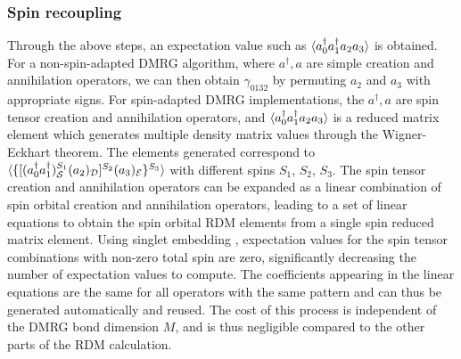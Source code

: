 \subsubsection{Spin recoupling}

Through the above steps, an expectation value such as $\braket{{a}^\dagger_0{a}^\dagger_1{a}_2{a}_3}$ is obtained. 
For a non-spin-adapted DMRG algorithm, where $a^\dag, a$ are simple creation and annihilation operators, 
we can then obtain $\gamma_{0132}$ by permuting $ {a}_2$ and ${a}_3$ with appropriate signs. For spin-adapted DMRG implementations, the $a^\dag, a$ 
are spin tensor creation and annihilation operators, and
$\braket{{a}^\dagger_0{a}^\dagger_1{a}_2{a}_3}$ is a reduced matrix element which generates multiple density matrix 
values through the Wigner-Eckhart theorem.
 The elements generated correspond to $\braket{\{[({a}^\dagger_0{a}^\dagger_1)^{S_1}_{\mathcal{S}}({a}_2)_{\mathcal{D}}]^{S_2}({a}_3)_{\mathcal{E}}\}^{S_3}}$ with different spins $S_1$, $S_2$, $S_3$. The spin tensor creation and annihilation operators can be expanded as a linear combination of spin orbital creation
and annihilation operators, leading to a set of linear equations to obtain the spin orbital RDM elements from a single spin reduced matrix element. Using singlet embedding \cite{tatsuaki_interaction-round--face_2000, sharma_2012}, expectation values for the spin tensor combinations with non-zero total spin are zero, significantly decreasing the number of 
expectation values to compute. The coefficients appearing in the linear equations are the same for all operators with the same pattern and can thus be generated 
automatically and reused. The cost of this process is independent of the DMRG bond dimension $M$, and is thus negligible compared to the other parts of the RDM calculation.

